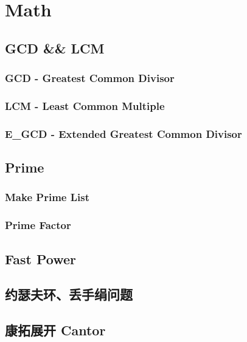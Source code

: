 \section{Math}
	\subsection{GCD \&\& LCM}
		\subsubsection{GCD - Greatest Common Divisor}
			
		\subsubsection{LCM - Least Common Multiple}
			
		\subsubsection{E\_GCD - Extended Greatest Common Divisor}
			
	\subsection{Prime}
		\subsubsection{Make Prime List}
			
		\subsubsection{Prime Factor}
			
	\subsection{Fast Power}
		
	\subsection{约瑟夫环、丢手绢问题}
		
	\subsection{康拓展开 Cantor}
		
